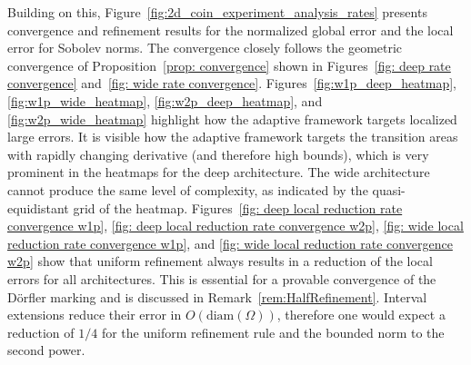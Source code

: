 \documentclass[a4paper, 11pt]{article}
\begin{document}
	Building on this, Figure~\ref{fig:2d_coin_experiment_analysis_rates} presents convergence and refinement results for the normalized global error and the local error for Sobolev norms.
	The convergence closely follows the geometric convergence of Proposition~\ref{prop: convergence} shown in Figures~\ref{fig: deep rate convergence} and~\ref{fig: wide rate convergence}. 
	Figures~\ref{fig:w1p_deep_heatmap}, \ref{fig:w1p_wide_heatmap}, \ref{fig:w2p_deep_heatmap}, and \ref{fig:w2p_wide_heatmap} highlight how the adaptive framework targets localized large errors. 
	It is visible how the adaptive framework targets the transition areas with rapidly changing derivative (and therefore high bounds), which is very prominent in the heatmaps for the deep architecture. 
	The wide architecture cannot produce the same level of complexity, as indicated by the quasi-equidistant grid of the heatmap. 
	Figures~\ref{fig: deep local reduction rate convergence w1p}, \ref{fig: deep local reduction rate convergence w2p}, \ref{fig: wide local reduction rate convergence w1p}, and \ref{fig: wide local reduction rate convergence w2p} show that uniform refinement always results in a reduction of the local errors for all architectures. 
	This is essential for a provable convergence of the Dörfler marking and is discussed in Remark~\ref{rem:HalfRefinement}. Interval extensions reduce their error in $O(\text{diam}(\Omega))$, therefore one would expect a reduction of $1/4$ for the uniform refinement rule and the bounded norm to the second power.
	
\end{document}

